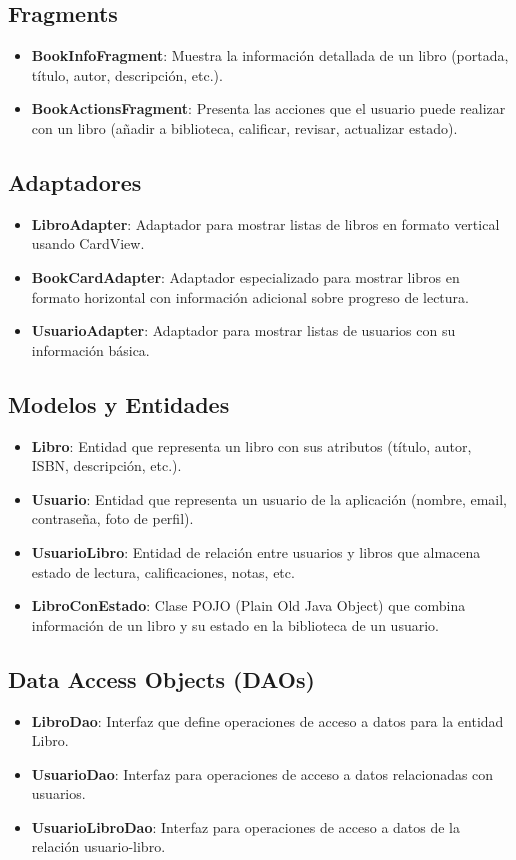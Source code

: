 \documentclass[a4paper,10pt]{report}
\begin{document}
      \subsection{Fragments}
      \begin{itemize}
        \item \textbf{BookInfoFragment}: Muestra la información detallada de un libro (portada, título, autor, descripción, etc.).
        \item \textbf{BookActionsFragment}: Presenta las acciones que el usuario puede realizar con un libro (añadir a biblioteca, calificar, revisar, actualizar estado).
      \end{itemize}
      \subsection{Adaptadores}
      \begin{itemize}
        \item \textbf{LibroAdapter}: Adaptador para mostrar listas de libros en formato vertical usando CardView.
        \item \textbf{BookCardAdapter}: Adaptador especializado para mostrar libros en formato horizontal con información adicional sobre progreso de lectura.
        \item \textbf{UsuarioAdapter}: Adaptador para mostrar listas de usuarios con su información básica.
      \end{itemize}
      \subsection{Modelos y Entidades}
      \begin{itemize}
        \item \textbf{Libro}: Entidad que representa un libro con sus atributos (título, autor, ISBN, descripción, etc.).
        \item \textbf{Usuario}: Entidad que representa un usuario de la aplicación (nombre, email, contraseña, foto de perfil).
        \item \textbf{UsuarioLibro}: Entidad de relación entre usuarios y libros que almacena estado de lectura, calificaciones, notas, etc.
        \item \textbf{LibroConEstado}: Clase POJO (Plain Old Java Object) que combina información de un libro y su estado en la biblioteca de un usuario.
      \end{itemize}
      \subsection{Data Access Objects (DAOs)}
      \begin{itemize}
        \item \textbf{LibroDao}: Interfaz que define operaciones de acceso a datos para la entidad Libro.
        \item \textbf{UsuarioDao}: Interfaz para operaciones de acceso a datos relacionadas con usuarios.
        \item \textbf{UsuarioLibroDao}: Interfaz para operaciones de acceso a datos de la relación usuario-libro.
      \end{itemize}
\end{document}
